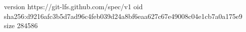 version https://git-lfs.github.com/spec/v1
oid sha256:d9216afc3b5d7ad96c4feb039d24a8bf6eaa627c67e49008c04e1cb7a0a175e9
size 284586
